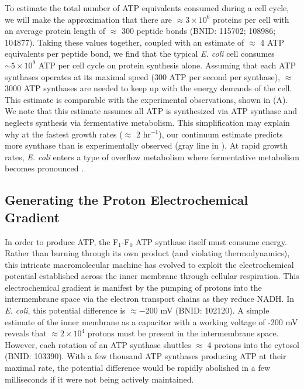 To estimate the total number of ATP equivalents consumed during a cell cycle, we
will make the approximation that there are $\approx 3\times10^6$ proteins per
cell with an average protein length of $\approx$ 300 peptide bonds (BNID:
115702; 108986; 104877). Taking these values together, coupled with an estimate
of $\approx$ 4 ATP equivalents per peptide bond, we find that the typical
\textit{E. coli} cell consumes $\sim 5 \times 10^9$ ATP per cell cycle on
protein synthesis alone. Assuming that each ATP synthases operates at its
maximal speed (300 ATP per second per synthase), $\approx$ 3000 ATP synthases
are needed to keep up with the energy demands of the cell. This estimate
is comparable with the experimental observations,  shown in
 (A). We note that this estimate assumes all ATP is
synthesized via ATP synthase and neglects synthesis via fermentative metabolism.
This simplification may explain why at the fastest growth rates ($\approx$ 2
hr$^{-1}$), our continuum estimate predicts more synthase than is experimentally
observed (gray line in ). At rapid growth rates,
\textit{E. coli} enters a type of overflow metabolism where fermentative
metabolism becomes pronounced \citep{szenk2017}.

\subsection{Generating the Proton Electrochemical Gradient}
In order to produce ATP, the F$_1$-F$_0$ ATP synthase itself must consume
energy. Rather than burning through its own product (and violating
thermodynamics), this intricate macromolecular machine has evolved to exploit
the electrochemical potential established across the inner membrane through
cellular respiration. This electrochemical gradient is manifest by the pumping
of protons into the intermembrane space via the electron transport chains as
they reduce NADH. In \textit{E. coli}, this potential difference is $\approx
-$200 mV (BNID: 102120). A simple estimate of the inner membrane as a capacitor
with a working voltage of -200 mV reveals that $\approx 2\times 10^4$ protons
must be present in the intermembrane space. However, each rotation of an ATP
synthase shuttles $\approx$ 4 protons into the cytosol (BNID: 103390). With a few thousand ATP
synthases producing ATP at their maximal rate, the potential difference would be
rapidly abolished in a few milliseconds if it were not being actively
maintained.

